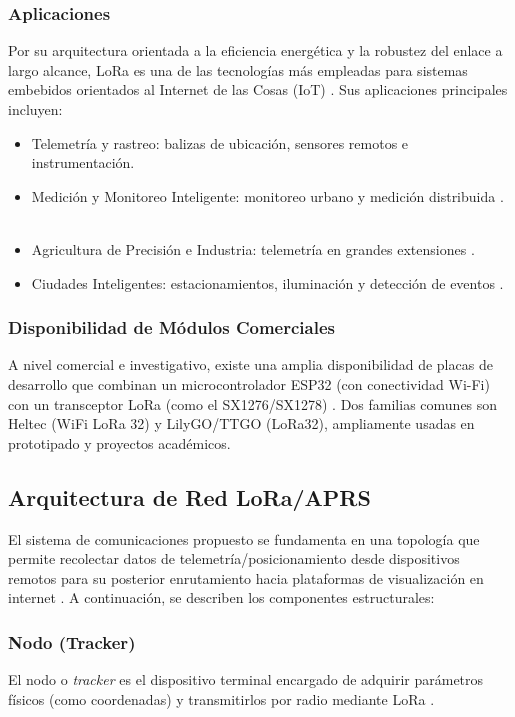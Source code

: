 \documentclass[conference]{IEEEtran}
\begin{document}
\subsubsection{Aplicaciones}
Por su arquitectura orientada a la eficiencia energética y la robustez del enlace a largo alcance, LoRa es una de las tecnologías más empleadas para sistemas embebidos orientados al Internet de las Cosas (IoT) \cite{deoliveira2022iot}. Sus aplicaciones principales incluyen:
\begin{itemize}
    \item Telemetría y rastreo: balizas de ubicación, sensores remotos e instrumentación.
    \item Medición y Monitoreo Inteligente: monitoreo urbano y medición distribuida \cite{deoliveira2022iot,rojnarong2024signal}.
    \item Agricultura de Precisión e Industria: telemetría en grandes extensiones \cite{rojnarong2024signal}.
    \item Ciudades Inteligentes: estacionamientos, iluminación y detección de eventos \cite{heltec_wiki}.
\end{itemize}

\subsubsection{Disponibilidad de Módulos Comerciales}
A nivel comercial e investigativo, existe una amplia disponibilidad de placas de desarrollo que combinan un microcontrolador ESP32 (con conectividad Wi-Fi) con un transceptor LoRa (como el SX1276/SX1278) \cite{deoliveira2022iot,heltec_wiki}. Dos familias comunes son Heltec (WiFi LoRa 32) y LilyGO/TTGO (LoRa32), ampliamente usadas en prototipado y proyectos académicos.

\subsection{Arquitectura de Red LoRa/APRS}
El sistema de comunicaciones propuesto se fundamenta en una topología que permite recolectar datos de telemetría/posicionamiento desde dispositivos remotos para su posterior enrutamiento hacia plataformas de visualización en internet \cite{sallum_aprs_2020}. A continuación, se describen los componentes estructurales:

\subsubsection{Nodo (Tracker)}
El nodo o \textit{tracker} es el dispositivo terminal encargado de adquirir parámetros físicos (como coordenadas) y transmitirlos por radio mediante LoRa \cite{sallum_aprs_2020,magrin_lora_2017}.
\end{document}
